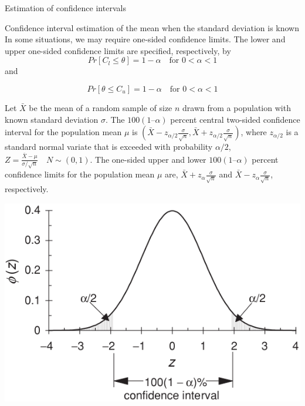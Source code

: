 \documentclass[8pt]{beamer}
\renewcommand{\emph}[1]{\textcolor{myorange}{#1}}
\begin{document}
\begin{frame}{Estimation of confidence intervals}
\begin{block}{Confidence interval estimation of the mean when the standard deviation is known}
    In some situations, we may require \emph{one-sided confidence limits}. The \emph{lower and upper one-sided confidence limits} are specified, respectively, by
    \[
        Pr[C_l \leq \theta] = 1 - \alpha \quad \text{for } 0 < \alpha < 1
    \]
    and

    \[
        Pr[\theta \leq C_u] = 1 - \alpha \quad \text{for } 0 < \alpha < 1
    \]
\end{block}

\begin{minipage}[t]{0.54\textwidth}
   \vspace{0pt} %
    Let $\bar{X}$ be the mean of a random sample of size $n$ drawn from a population with known standard deviation $\sigma$. The $100(1 – \alpha)$ percent central two-sided confidence interval for the population mean $\mu$ is $\left( \bar{X} - z_{\alpha/2} \frac{\sigma}{\sqrt{n}}, \bar{X} + z_{\alpha/2} \frac{\sigma}{\sqrt{n}} \right)$, where $z_{\alpha/2}$ is a standard normal variate that is exceeded with probability $\alpha/2$, $Z = \frac{\bar{X}- \mu}{\sigma/\sqrt{n}} \quad N \sim (0,1)$. The one-sided upper and lower $100(1 – \alpha)$ percent confidence limits for the population mean $\mu$ are, $\bar{X} + z_{\alpha} \frac{\sigma}{\sqrt{n}} $ and $\bar{X} - z_{\alpha} \frac{\sigma}{\sqrt{n}} $, respectively. 
\end{minipage}
\begin{minipage}[t]{0.44\textwidth}
   \vspace{0pt} %
    \centering
    \includegraphics[width=\textwidth]{fi531.png}
\end{minipage}

\end{frame}
\end{document}

